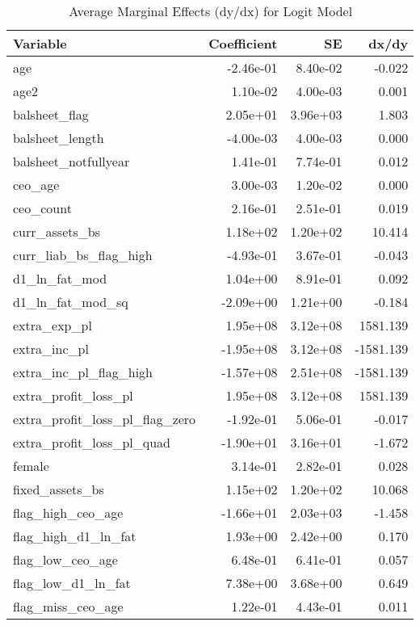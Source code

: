 \begin{table}

\caption{Average Marginal Effects (dy/dx) for Logit Model}
\centering
\begin{tabular}[t]{l|r|r|r}
\hline
Variable & Coefficient & SE & dx/dy\\
\hline
age & -2.46e-01 & 8.40e-02 & -0.022\\
\hline
age2 & 1.10e-02 & 4.00e-03 & 0.001\\
\hline
balsheet\_flag & 2.05e+01 & 3.96e+03 & 1.803\\
\hline
balsheet\_length & -4.00e-03 & 4.00e-03 & 0.000\\
\hline
balsheet\_notfullyear & 1.41e-01 & 7.74e-01 & 0.012\\
\hline
ceo\_age & 3.00e-03 & 1.20e-02 & 0.000\\
\hline
ceo\_count & 2.16e-01 & 2.51e-01 & 0.019\\
\hline
curr\_assets\_bs & 1.18e+02 & 1.20e+02 & 10.414\\
\hline
curr\_liab\_bs\_flag\_high & -4.93e-01 & 3.67e-01 & -0.043\\
\hline
d1\_ln\_fat\_mod & 1.04e+00 & 8.91e-01 & 0.092\\
\hline
d1\_ln\_fat\_mod\_sq & -2.09e+00 & 1.21e+00 & -0.184\\
\hline
extra\_exp\_pl & 1.95e+08 & 3.12e+08 & 1581.139\\
\hline
extra\_inc\_pl & -1.95e+08 & 3.12e+08 & -1581.139\\
\hline
extra\_inc\_pl\_flag\_high & -1.57e+08 & 2.51e+08 & -1581.139\\
\hline
extra\_profit\_loss\_pl & 1.95e+08 & 3.12e+08 & 1581.139\\
\hline
extra\_profit\_loss\_pl\_flag\_zero & -1.92e-01 & 5.06e-01 & -0.017\\
\hline
extra\_profit\_loss\_pl\_quad & -1.90e+01 & 3.16e+01 & -1.672\\
\hline
female & 3.14e-01 & 2.82e-01 & 0.028\\
\hline
fixed\_assets\_bs & 1.15e+02 & 1.20e+02 & 10.068\\
\hline
flag\_high\_ceo\_age & -1.66e+01 & 2.03e+03 & -1.458\\
\hline
flag\_high\_d1\_ln\_fat & 1.93e+00 & 2.42e+00 & 0.170\\
\hline
flag\_low\_ceo\_age & 6.48e-01 & 6.41e-01 & 0.057\\
\hline
flag\_low\_d1\_ln\_fat & 7.38e+00 & 3.68e+00 & 0.649\\
\hline
flag\_miss\_ceo\_age & 1.22e-01 & 4.43e-01 & 0.011\\

\end{tabular}
\end{table}
